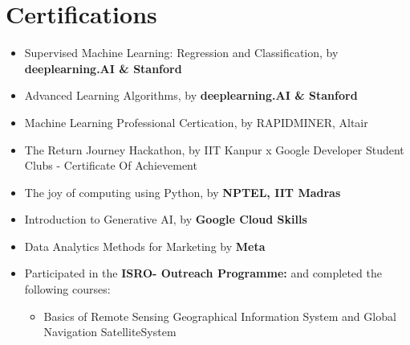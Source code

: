 \documentclass[10.8pt, a4paper]{extarticle}
\newcommand{\shorterSection}[1]{\vspace{-10pt}\section{#1}}
\begin{document}
\shorterSection{Certifications}
\begin{itemize}

\item Supervised Machine Learning: Regression and Classification, by \textbf{deeplearning.AI \& Stanford } \href{https://www.coursera.org/account/accomplishments/certificate/TECTFLUN93UC}{\faLink{}}\\[-0.6cm]

\item Advanced Learning Algorithms, by \textbf{deeplearning.AI \& Stanford } \href{https://www.coursera.org/account/accomplishments/certificate/PLNJXZ9JXVXJ}{\faLink{}}\\[-0.6cm]

\item Machine Learning Professional Certication, by RAPIDMINER, Altair \href{https://ti-user-certificates.s3.amazonaws.com/5733896a-1d71-46e5-b0a3-1ffcf845fe21/c270e7f8-c92a-4370-9507-4d8110f8ee23-souvik-mukherjee-c07e2e8a-577a-4baf-81ae-11aa76e694cd-certificate.pdf}{\faLink{}}\\[-0.6cm]

\item The Return Journey Hackathon, by IIT Kanpur x Google Developer Student Clubs - Certificate Of Achievement \href{https://drive.google.com/file/d/1J4PNmZKNsVgmEhSCm27sZNX8vNFhKZRA/view?usp=drive_link}{\faLink{}}\\[-0.6cm] 

\item The joy of computing using Python, by \textbf{NPTEL, IIT Madras }  \href{https://drive.google.com/file/d/1-0Q_gA_cl3bb7sPyZOA3OtV0fbmRLQvz/view?usp=sharing}{\faLink{}}\\[-0.6cm]

\item Introduction to Generative AI, by \textbf{Google Cloud Skills }\href{https://www.cloudskillsboost.google/public_profiles/76755a5d-f18b-4787-89db-bd6be0b3e066/badges/4178524}{\faLink{}}\\[-0.6cm]

\item Data Analytics Methods for Marketing by \textbf{Meta}\href{https://www.coursera.org/account/accomplishments/certificate/JPUQ5DJBDZN6}{\faLink{}}\\[-0.6cm]

\item Participated in the \textbf{ISRO- Outreach Programme:}  and completed the following courses: 
\begin{itemize}
    \item Basics of Remote Sensing Geographical Information System and Global Navigation SatelliteSystem \href{https://drive.google.com/file/d/15E-FXqYPGD-uRhFIRUu4WKobbqnBvlAh/view?usp=sharing}{\faLink{}}
    

\end{itemize}
\end{itemize}
\end{document}
